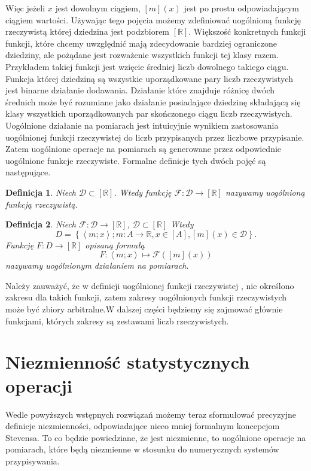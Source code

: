 \documentclass[12pt,a4paper]{report}
\newtheorem{definition}{Definicja}[chapter]
\newcommand{\parauporzadkowana}[2]{\left\langle {#1}; {#2} \right\rangle}
\newcommand{\zbior}[1]{\left\lbrace {#1} \right\rbrace }
\newcommand{\domkniecie}[1]{\left\lbrack{#1}\right\rbrack}
\begin{document}
Więc jeżeli $x$ jest dowolnym ciągiem, $\domkniecie{m}(x)$ jest po prostu odpowiadającym ciągiem wartości. Używając tego pojęcia możemy zdefiniować uogólnioną funkcję rzeczywistą której dziedzina jest podzbiorem $\domkniecie{\mathbb{R}}$. Większość konkretnych funkcji funkcji, które chcemy uwzględnić mają zdecydowanie bardziej ograniczone dziedziny, ale pożądane jest rozważenie wszystkich funkcji tej klasy razem. Przykładem takiej funkcji jest wzięcie średniej  liczb dowolnego takiego ciągu. Funkcja której dziedziną są wszystkie uporządkowane pary liczb rzeczywistych jest binarne działanie dodawania. Działanie które znajduje różnicę dwóch średnich może być rozumiane jako działanie posiadające dziedzinę składającą się klasy wszystkich uporządkowanych par skończonego ciągu liczb rzeczywistych. Uogólnione działanie na pomiarach jest intuicyjnie wynikiem zastosowania uogólnionej funkcji rzeczywistej  do liczb przypisanych przez liczbowe przypisanie. Zatem uogólnione operacje na pomiarach są generowane przez odpowiednie uogólnione funkcje rzeczywiste. Formalne definicje tych dwóch pojęć są następujące.
\begin{definition}
Niech $\mathcal{D}\subset \domkniecie{\mathbb{R}}$. Wtedy funkcję $\mathcal{F}:\mathcal{D}\to \domkniecie{\mathbb{R}}$ nazywamy uogólnioną funkcją rzeczywistą.
\end{definition}
\begin{definition}
Niech $\mathcal{F}:\mathcal{D}\to \domkniecie{\mathbb{R}}$, $\mathcal{D}\subset\domkniecie{\mathbb{R}}$ Wtedy
$$
D=\zbior{\parauporzadkowana{m}{x}; m:A\to \mathbb{R}, x\in \domkniecie{A}, \domkniecie{m}(x)\in \mathcal{D}}.
$$
Funkcję $F:D\to\domkniecie{\mathbb{R}}$ opisaną formułą
$$
F:\parauporzadkowana{m}{x}\longmapsto\mathcal{F}(\domkniecie{m}(x))
$$
nazywamy uogólnionym działaniem na pomiarach.
\end{definition}
Należy zauważyć, że w definicji uogólnionej funkcji rzeczywistej , nie określono zakresu dla takich funkcji, zatem zakresy uogólnionych funkcji rzeczywistych może być zbiory arbitralne.W dalszej części będziemy się zajmować głównie funkcjami, których zakresy są zestawami liczb rzeczywistych. 

\section{Niezmienność statystycznych operacji}
Wedle powyższych wstępnych rozwiązań możemy teraz sformułować precyzyjne definicje niezmienności, odpowiadające nieco mniej formalnym koncepcjom Stevensa. To co będzie powiedziane, że jest niezmienne, to uogólnione operacje na pomiarach, które będą niezmienne w stosunku do numerycznych systemów przypisywania.
\end{document}
